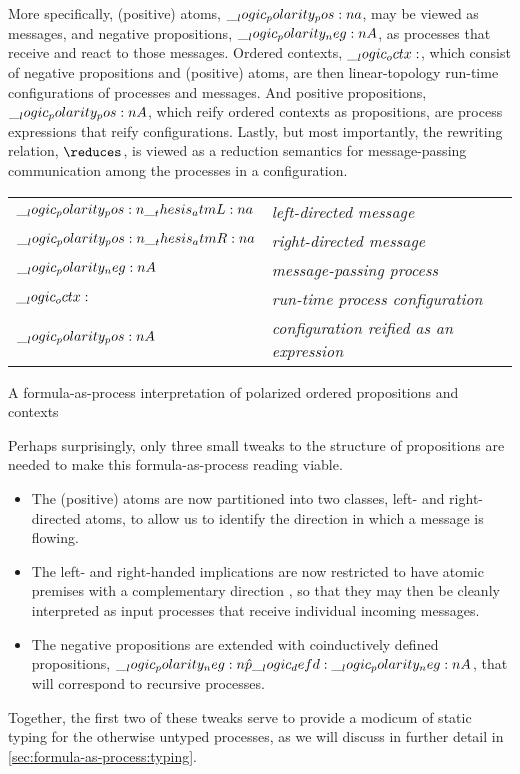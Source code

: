 More specifically,
(positive) atoms, $\__logic_polarity_pos:n {a}$, may be viewed as messages, and negative propositions, $\__logic_polarity_neg:n {A}$, as processes that receive and react to those messages.
Ordered contexts, $\__logic_octx:$, which consist of negative propositions and (positive) atoms, are then linear-topology run-time configurations of processes and messages.
And positive propositions, $\__logic_polarity_pos:n {A}$, which reify ordered contexts as propositions, are process expressions that reify configurations.
Lastly, but most importantly, the rewriting relation, $\reduces$, is viewed as a reduction semantics for message-passing communication among the processes in a configuration.%
\begin{margintable}
  \begin{center}
    \begin{tabular}{@{}l@{\enspace\ }>{\itshape}l@{}}
      $\__logic_polarity_pos:n {\__thesis_atmL:n {a}}$ & left-directed message \\
      $\__logic_polarity_pos:n {\__thesis_atmR:n {a}}$ & right-directed message \\
      $\__logic_polarity_neg:n {A}$ & message-passing process \\
      $\__logic_octx:$ & run-time process configuration \\
      $\__logic_polarity_pos:n {A}$ & configuration reified as an expression
    \end{tabular}
  \end{center}
  \caption{A formula-as-process interpretation of polarized ordered propositions and contexts}\label{fig:choreographies:propctx-table}
\end{margintable}%

Perhaps surprisingly, only three small tweaks to the structure of propositions are needed to make this formula-as-process reading viable.
\begin{itemize}
\item
  The (positive) atoms are now partitioned into two classes, left- and right-directed atoms, to allow us to identify the direction in which a message is flowing.

\item
  The left- and right-handed implications are now restricted to have atomic premises with a complementary direction
  , so that they may then be cleanly interpreted as input processes that receive  individual incoming messages.

\item 
  The negative propositions are extended with coinductively defined propositions, $\__logic_polarity_neg:n {\hat{p}} \__logic_defd: \__logic_polarity_neg:n {A}$, that will correspond to recursive processes.
\end{itemize}
Together, the first two of these tweaks serve to provide a modicum of static typing for the otherwise untyped processes, as we will discuss in further detail in \cref{sec:formula-as-process:typing}.

